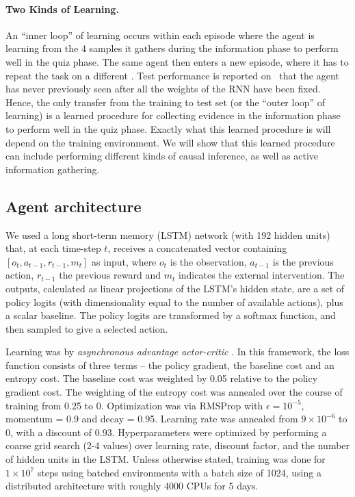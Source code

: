 \paragraph{Two Kinds of Learning.}
An ``inner loop'' of learning occurs within each episode where the agent is learning from the 4 samples it gathers during the information phase to perform well in the quiz phase. The same agent then enters a new episode, where it has to repeat the task on a different \CBN. Test performance is reported on \CBNs~that the agent has never previously seen after all the weights of the RNN have been fixed. Hence, the only transfer from the training to test set (or the ``outer loop'' of learning) is a learned procedure for collecting evidence in the information phase to perform well in the quiz phase. Exactly what this learned procedure is will depend on the training environment. We will show that this learned procedure can include performing different kinds of causal inference, as well as active information gathering. 


\subsection{Agent architecture}

We used a long short-term memory (LSTM) network \citep{hochreiter97long} (with 192 hidden units) that, at each time-step $t$, receives a concatenated vector containing $[o_{t}, a_{t-1}, r_{t-1}, m_{t}]$ as input, where $o_{t}$ is the observation, $a_{t-1}$ is the previous action, $r_{t-1}$ the previous reward and $m_t$ indicates the external intervention. The outputs, calculated as linear projections of the LSTM's hidden state, are a set of policy logits (with dimensionality equal to the number of available actions), plus a scalar baseline. The policy logits are transformed by a softmax function, and then sampled to give a selected action. 

Learning was by \emph{asynchronous advantage actor-critic} \citep{mnih2016}. In this framework, the loss function consists of three terms -- the policy gradient, the baseline cost and an entropy cost. The baseline cost was weighted by 0.05 relative to the policy gradient cost. The weighting of the entropy cost was annealed over the course of training from 0.25 to 0. Optimization was via RMSProp with $\epsilon = 10^{-5}$, momentum = 0.9 and decay = 0.95. Learning rate was annealed from $9\times 10^{-6}$ to 0, with a discount of 0.93. Hyperparameters were optimized by performing a coarse grid search (2-4 values) over learning rate, discount factor, and the number of hidden units in the LSTM. Unless otherwise stated, training was done for $1\times10^7$ steps using batched environments with a batch size of 1024, using a distributed architecture with roughly 4000 CPUs for 5 days.

